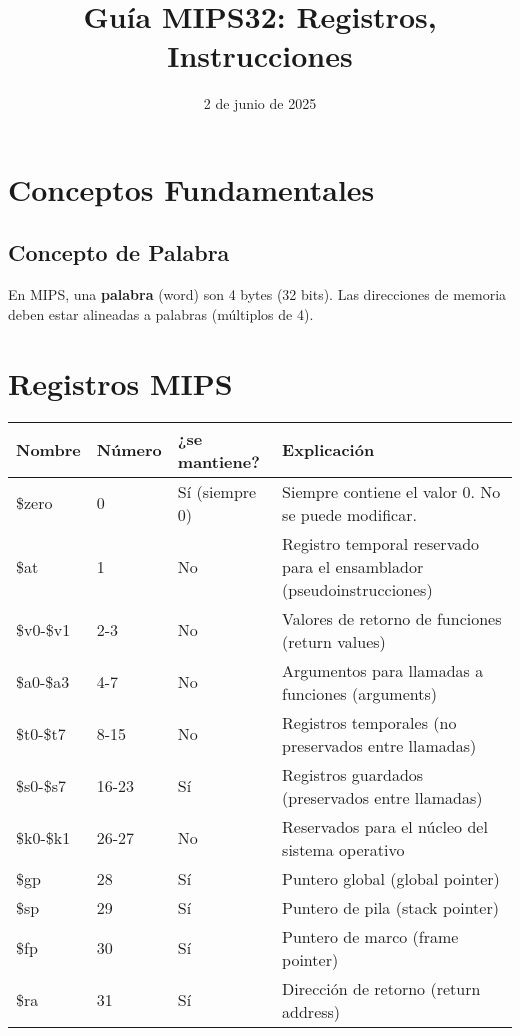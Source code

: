\documentclass{article}
\title{Guía MIPS32: Registros, Instrucciones}
\date{2 de junio de 2025}
\begin{document}
\maketitle

\section{Conceptos Fundamentales}

\subsection{Concepto de Palabra}
En MIPS, una \textbf{palabra} (word) son 4 bytes (32 bits). Las direcciones de memoria deben estar alineadas a palabras (múltiplos de 4).

\section{Registros MIPS}

\begin{table}[h]
\centering
\begin{tabular}{lllp{6cm}}
\toprule
\textbf{Nombre} & \textbf{Número} & \textbf{¿se mantiene?} & \textbf{Explicación} \\
\midrule
\$zero & 0 & Sí (siempre 0) & Siempre contiene el valor 0. No se puede modificar. \\
\$at & 1 & No & Registro temporal reservado para el ensamblador (pseudoinstrucciones) \\
\$v0-\$v1 & 2-3 & No & Valores de retorno de funciones (return values) \\
\$a0-\$a3 & 4-7 & No & Argumentos para llamadas a funciones (arguments) \\
\$t0-\$t7 & 8-15 & No & Registros temporales (no preservados entre llamadas) \\
\$s0-\$s7 & 16-23 & Sí & Registros guardados (preservados entre llamadas) \\
\$k0-\$k1 & 26-27 & No & Reservados para el núcleo del sistema operativo \\
\$gp & 28 & Sí & Puntero global (global pointer) \\
\$sp & 29 & Sí & Puntero de pila (stack pointer) \\
\$fp & 30 & Sí & Puntero de marco (frame pointer) \\
\$ra & 31 & Sí & Dirección de retorno (return address) \\
\bottomrule
\end{tabular}
\end{table}
\end{document}
